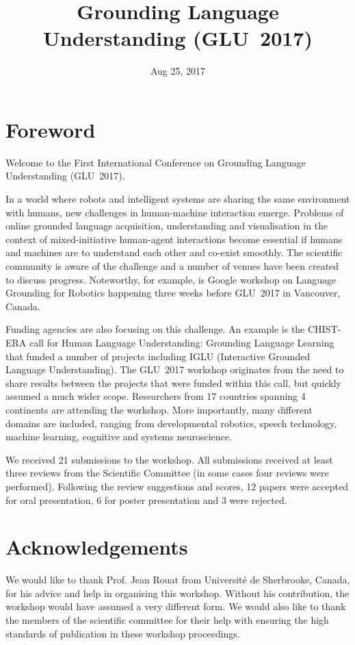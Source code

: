 \documentclass{confproc}
\title{Grounding Language Understanding (GLU~2017)}
\date{Aug 25, 2017}
\begin{document}
\maketitle
\newpage
\section*{Foreword}
Welcome to the First International Conference on Grounding Language Understanding (GLU~2017).

In a world where robots and intelligent systems are sharing the same environment with humans, new challenges in human-machine interaction emerge.
Problems of online grounded language acquisition, understanding and visualisation in the context of mixed-initiative human-agent interactions become essential if humans and machines are to understand each other and co-exist smoothly.
The scientific community is aware of the challenge and a number of venues have been created to discuss progress.
Noteworthy, for example, is Google workshop on Language Grounding for Robotics happening three weeks before GLU~2017 in Vancouver, Canada.

Funding agencies are also focusing on this challenge.
An example is the CHIST-ERA call for Human Language Understanding: Grounding Language Learning that funded a number of projects including IGLU (Interactive Grounded Language Understanding).
The GLU~2017 workshop originates from the need to share results between the projects that were funded within this call, but quickly assumed a much wider scope.
Researchers from 17 countries spanning 4 continents are attending the workshop.
More importantly, many different domains are included, ranging from developmental robotics, speech technology, machine learning, cognitive and systems neuroscience.

We received 21 submissions to the workshop. All submissions received at least three reviews from the Scientific Committee (in some cases four reviews were performed). Following the review suggestions and scores, 12 papers were accepted for oral presentation, 6 for poster presentation and 3 were rejected.

\section*{Acknowledgements}
We would like to thank Prof. Jean Rouat from Université de Sherbrooke, Canada, for his advice and help in organising this workshop. Without his contribution, the workshop would have assumed a very different form. We would also like to thank the members of the scientific committee for their help with ensuring the high standards of publication in these workshop proceedings.
\end{document}
